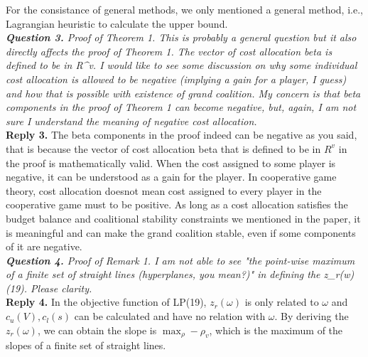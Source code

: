 \documentclass[11pt]{article}
\begin{document}
For the consistance of general methods, we only mentioned a general method, i.e., Lagrangian heuristic to calculate the upper bound.
\\[4mm]
%
%
%
\noindent \textit{\textbf{Question 3.}
Proof of Theorem 1. This is probably a general question but it also directly affects the proof of Theorem 1. The vector of cost allocation beta is defined to be in R^v.
I would like to see some discussion on why some individual cost allocation is allowed to be negative (implying a gain for a player, I guess) and how that is possible with existence of grand coalition. My concern is that beta components in the proof of Theorem 1 can become negative, but, again, I am not sure I understand the meaning of negative cost allocation.
}
\\[2mm]
\noindent \textbf{Reply 3.}
The beta components in the proof indeed can be negative as you said, that is because the vector of cost allocation beta that is defined to be in $R^v$ in the proof is mathematically valid. When the cost assigned to some player is negative, it can be understood as a gain for the player. In cooperative game theory, cost allocation doesnot mean cost assigned to every player in the cooperative game must to be positive. As long as a cost allocation satisfies the budget balance and coalitional stability constraints we mentioned in the paper, it is meaningful and can make the grand coalition stable, even if some components of it are negative.
\\[4mm]
%
%
%
\noindent \textit{\textbf{Question 4.}
Proof of Remark 1. I am not able to see "the point-wise maximum of a finite set of straight lines (hyperplanes, you mean?)" in defining the z_r(w) (19). Please clarity.
}
\\[2mm]
\noindent \textbf{Reply 4.}
In the objective function of LP(19), $z_r(\omega)$ is only related to $\omega$ and $c_u(V), c_l(s)$ can be calculated and have no relation with $\omega$. By deriving the $z_r(\omega)$, we can obtain the slope is $\max_\rho -\rho_v$, which is the maximum of the slopes of a finite set of straight lines.
\\[4mm]
\end{document}

